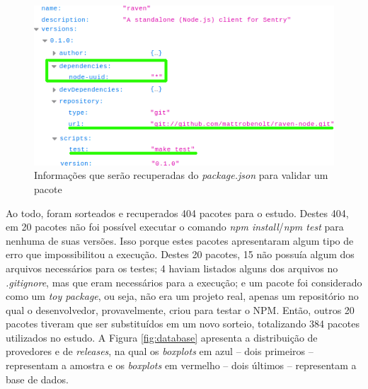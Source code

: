 \begin{figure}
    \centering
    \includegraphics[scale=0.7]{figuras/package_json.png}
    \caption{Informações que serão recuperadas do \textit{package.json} para validar um pacote}
    \label{fig:package_json}
\end{figure}{}

Ao todo, foram sorteados e recuperados 404 pacotes para o estudo. Destes 404, em 20 pacotes não foi possível executar o comando \textit{npm install}/\textit{npm test} para nenhuma de suas versões. Isso porque estes pacotes apresentaram algum tipo de erro que impossibilitou a execução. Destes 20 pacotes, 15 não possuía algum dos arquivos necessários para os testes; 4 haviam listados alguns dos arquivos no \textit{.gitignore}, mas que eram necessários para a execução; e um pacote foi considerado como um \textit{toy package}, ou seja, não era um projeto real, apenas um repositório no qual o desenvolvedor, provavelmente, criou para testar o \gls{NPM}. Então, outros 20 pacotes tiveram que ser substituídos em um novo sorteio, totalizando 384 pacotes utilizados no estudo. A Figura \ref{fig:database} apresenta a distribuição de provedores e de \textit{releases}, na qual os \textit{boxplots} em azul -- dois primeiros -- representam a amostra e os \textit{boxplots} em vermelho -- dois últimos -- representam a base de dados.


